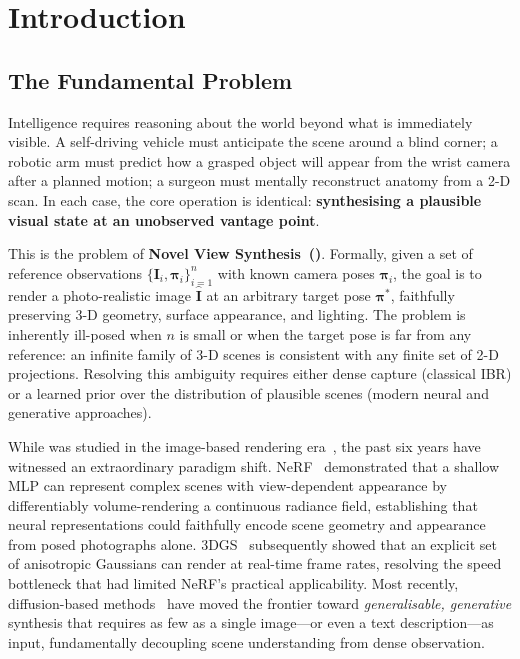 \section{Introduction}
\label{sec:intro}

\subsection{The Fundamental Problem}

Intelligence requires reasoning about the world beyond what is immediately
visible.
A self-driving vehicle must anticipate the scene around a blind corner;
a robotic arm must predict how a grasped object will appear from the wrist
camera after a planned motion; a surgeon must mentally reconstruct
anatomy from a 2-D scan.
In each case, the core operation is identical: \textbf{synthesising a
plausible visual state at an unobserved vantage point}.

This is the problem of \textbf{Novel View Synthesis~(\nvs)}.
Formally, given a set of reference observations
$\{\mathbf{I}_i, \boldsymbol{\pi}_i\}_{i=1}^{n}$ with known camera poses
$\boldsymbol{\pi}_i$, the goal is to render a photo-realistic image
$\hat{\mathbf{I}}$ at an arbitrary target pose $\boldsymbol{\pi}^{*}$,
faithfully preserving 3-D geometry, surface appearance, and lighting.
The problem is inherently ill-posed when $n$ is small or when the target
pose is far from any reference: an infinite family of 3-D scenes
is consistent with any finite set of 2-D projections.
Resolving this ambiguity requires either dense capture (classical IBR) or
a learned prior over the distribution of plausible scenes (modern neural
and generative approaches).

While \nvs{} was studied in the image-based rendering
era~\citep{levoy1996light,mcmillan1995plenoptic,chen1993view,debevec1996modeling},
the past six years have witnessed an extraordinary paradigm shift.
NeRF~\citep{mildenhall2020nerf} demonstrated that a shallow MLP can represent
complex scenes with view-dependent appearance by differentiably volume-rendering
a continuous radiance field, establishing that neural representations could
faithfully encode scene geometry and appearance from posed photographs alone.
3DGS~\citep{kerbl2023gaussian} subsequently showed that an explicit set of
anisotropic Gaussians can render at real-time frame rates, resolving the
speed bottleneck that had limited NeRF's practical applicability.
Most recently, diffusion-based methods~\citep{liu2023zero1to3,poole2023dreamfusion,yu2024viewcrafter}
have moved the frontier toward \emph{generalisable, generative} synthesis
that requires as few as a single image---or even a text description---as input,
fundamentally decoupling scene understanding from dense observation.

